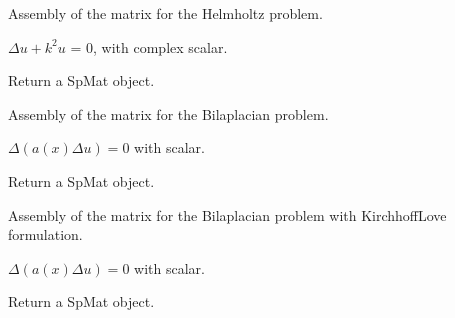 \documentclass[a4paper,11pt,english]{sphinxmanual}
\begin{document}

\begin{fulllineitems}
\label{\detokenize{python/cmdref_Module asm:getfem.asm_helmholtz}}
Assembly of the matrix for the Helmholtz problem.

\(\Delta u + k^2 u\) = 0,  with  complex scalar.

Return a SpMat object.

\end{fulllineitems}


\begin{fulllineitems}
\label{\detokenize{python/cmdref_Module asm:getfem.asm_bilaplacian}}
Assembly of the matrix for the Bilaplacian problem.

\(\Delta(a(x)\Delta u) = 0\)   with  scalar.

Return a SpMat object.

\end{fulllineitems}


\begin{fulllineitems}
\label{\detokenize{python/cmdref_Module asm:getfem.asm_bilaplacian_KL}}
Assembly of the matrix for the Bilaplacian problem with Kirchhoff\sphinxhyphen{}Love formulation.

\(\Delta(a(x)\Delta u) = 0\)   with  scalar.

Return a SpMat object.

\end{fulllineitems}
\end{document}
